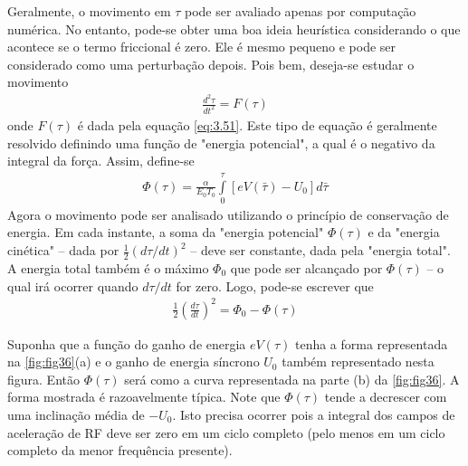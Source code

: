 Geralmente, o movimento em $\tau$ pode ser avaliado apenas por computação numérica. No entanto, pode-se obter uma boa ideia heurística considerando o que acontece se o termo friccional é zero. Ele é mesmo pequeno e pode ser considerado como uma perturbação depois. Pois bem, deseja-se estudar o movimento
\begin{align}
	\frac{d^2\tau}{dt^2} = F(\tau)
\end{align}
onde $F(\tau)$ é dada pela equação \eqref{eq:3.51}. Este tipo de equação é geralmente resolvido definindo uma função de "energia potencial", a qual é o negativo da integral da força. Assim, define-se
\begin{align}
	\Phi(\tau) = \frac{\alpha}{E_0 T_0} \int\limits_{0}^{\tau}[eV(\bar{\tau}) - U_0]d\bar{\tau}\label{eq:3.53}
\end{align}
Agora o movimento pode ser analisado utilizando o princípio de conservação de energia. Em cada instante, a soma da "energia potencial" $\Phi(\tau)$ e da "energia cinética" -- dada por $\frac{1}{2}(d\tau/dt)^2$ -- deve ser constante, dada pela "energia total". A energia total também é o máximo $\Phi_0$ que pode ser alcançado por $\Phi(\tau)$ -- o qual irá ocorrer quando $d\tau/dt$ for zero. Logo, pode-se escrever que
\begin{align}
	\frac{1}{2}\left(\frac{d\tau}{dt}\right)^2 = \Phi_0 - \Phi(\tau)\label{eq:3.54}
\end{align}

Suponha que a função do ganho de energia $eV(\tau)$ tenha a forma representada na \autoref{fig:fig36}(a) e o ganho de energia síncrono $U_0$ também representado nesta figura. Então $\Phi(\tau)$ será como a curva representada na parte (b) da \autoref{fig:fig36}. A forma mostrada é razoavelmente típica. Note que $\Phi(\tau)$ tende a decrescer com uma inclinação média de $-U_0$. Isto precisa ocorrer pois a integral dos campos de aceleração de RF deve ser zero em um ciclo completo (pelo menos em um ciclo completo da menor frequência presente).

